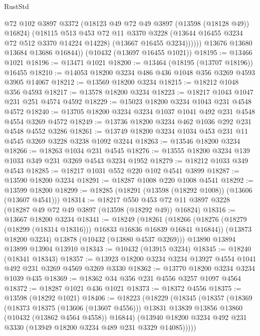 \begin{lexlean}{RustStd}
\begin{coremodule}
                @72
                @102
                @3897
                @3372
                (@18123 @49 @72 @49 @3897 (@13598 (@18128 @49)) @16824)
                (@18115
                  @513
                  @453
                  @72
                  @11
                  @3370
                  @3228
                  (@13644 @16455 @3234 @72 @512 @3370 @14224 @14228)
                  (@13667 @16455 @3234))))))
        @13676
        @13680
        @13684
        @13686
        @16844))
    (@10432 (@13697 @16455 @1021))
@18195 := @13466 @1021
@18196 := @13471 @1021
@18200 := @13464 (@18195 (@13707 @18196)) @16455
@18210 := @14053 @18200 @3234 @486 @436 @1048 @356 @3269 @4593 @3905 @14067
@18212 := @13569 @18200 @3234
@18215 := @18212 @1048 @356 @4593
@18217 := @13578 @18200 @3234
@18223 := @18217 @1043 @1047 @231 @251 @4574 @4592
@18229 := @15023 @18200 @3234 @1043 @231 @4548 @4572
@18240 := @13705 @18200 @3234 @3234 @1037 @1041 @492 @231 @4548 @4554 @3269 @4572
@18249 := @13736 @18200 @3234 @462 @1036 @292 @231 @4548 @4552 @3286
@18261 := @13749 @18200 @3234 @1034 @453 @231 @11 @4545 @3269 @3228 @3238 @1092 @3244
@18263 := @13546 @18200 @3234
@18266 := @18263 @1034 @231 @4545
@18276 := @13555 @18200 @3234 @139 @1033 @349 @231 @3269 @4543 @3234 @1952
@18279 := @18212 @1033 @349 @4543
@18285 := @18217 @1031 @552 @220 @102 @4541 @3899
@18287 := @13590 @18200 @3234
@18291 := @18287 @1008 @220 @1008 @4541
@18292 := @13599 @18200
@18299 := @18285 (@18291 (@13598 (@18292 @1008)) (@13606 (@13607 @4541)))
@18314 := @18217
    @550
    @453
    @72
    @11
    @3897
    @3228
    (@18287 @49 @72 @49 @3897 (@13598 (@18292 @49)) @16824)
@18316 := @13667 @18200 @3234
@18341 := @18249
    (@18261
      (@18266 (@18276 (@18279 (@18299 (@18314 @18316))) @16833 @16836 @16839 @16841 @16844))
      (@13873 @18200 @3234)
      @13878
      (@10432 (@13880 @4537 @3269)))
    @13890
    @13894
    @13899
    @13904
    @13910
@18343 := @10432 (@13915 @3234)
@18345 := @18240 (@18341 @18343)
@18357 := @13923 @18200 @3234 @3234 @13927 @4554 @1041 @492 @231 @3269 @4569 @3269 @3330
@18362 := @13770 @18200 @3234 @3234 @1039 @435
@18369 := @18362 @34 @356 @231 @4556 @3257 @1097 @4564
@18372 := @18287 @1021 @436 @1021
@18373 := @18372 @4556
@18375 := @13598 (@18292 @1021)
@18406 := @18223
    (@18229
      (@18345
        (@18357
          (@18369
            (@18373 @18375 (@13606 (@13607 @4556)))
            @13831
            @13839
            @13856
            @13860
            (@10432 (@13862 @4564 @4558))
            @16844)
          (@13940 @18200 @3234 @492 @231 @3330 (@13949 @18200 @3234 @489 @231 @3329 @14085)))))

\end{coremodule}
\end{lexlean}
